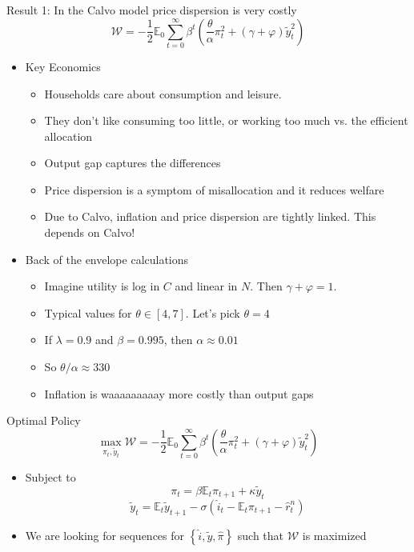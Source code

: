 \documentclass[11pt,aspectratio=169,xcolor={dvipsnames},hyperref={pdftex,pdfpagemode=UseNone,hidelinks,pdfdisplaydoctitle=true},usepdftitle=false]{beamer}
\begin{document}
\begin{frame}{Result 1: In the Calvo model price dispersion is very costly}
$$\mathcal{W} = -\frac{1}{2 }\mathbb{E}_0 \sum_{t=0}^{\infty} \beta^t \left(\frac{\theta}{\alpha}\pi^2_t + (\gamma + \varphi) \tilde{y}^2_t \right)$$
\begin{itemize}
\item Key Economics
\begin{itemize}
\item Households care about consumption and leisure.
\item They don't like consuming too little, or working too much vs. the efficient allocation
\item Output gap captures the differences
\item Price dispersion is a symptom of misallocation and it reduces welfare
\item Due to Calvo, inflation and price dispersion are tightly linked. This depends on Calvo!
\end{itemize}
\item Back of the envelope calculations
\begin{itemize}
\item Imagine utility is log in $C$ and linear in $N$. Then $\gamma + \varphi = 1$.
\item Typical values for  $\theta \in [4,7]$. Let's pick $\theta = 4$
\item If $\lambda = 0.9$ and $\beta = 0.995$, then $\alpha \approx 0.01$
\item So $\theta/\alpha \approx 330$
\item Inflation is waaaaaaaaay more costly than output gaps
\end{itemize}
\end{itemize}
\end{frame}


\begin{frame}{Optimal Policy}
$$\max_{\pi_t, \tilde{y}_t}\mathcal{W} = -\frac{1}{2 }\mathbb{E}_0 \sum_{t=0}^{\infty} \beta^t \left(\frac{\theta}{\alpha}\pi^2_t + (\gamma + \varphi) \tilde{y}^2_t \right)$$
\begin{itemize}
\item Subject to 
$$\pi_t = \beta \mathbb{E}_t \pi_{t+1} + \kappa \tilde{y}_t$$
$$\tilde{y}_t = \mathbb{E}_t \tilde{y}_{t+1} - \sigma(\hat{i}_t - \mathbb{E}_t \pi_{t+1} - \hat{r}^n_t)$$
\item We are looking for sequences for $\left\lbrace \hat{i}, \tilde{y}, \hat{\pi}\right\rbrace$ such that $\mathcal{W}$ is maximized
\end{itemize}
\end{frame}
\end{document}
